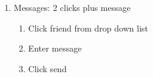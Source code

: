 \begin{enumerate}
\item Messages: 2 clicks plus message
\begin{enumerate}
\item Click friend from drop down list
\item Enter message
\item Click send
\end{enumerate}
\end{enumerate}